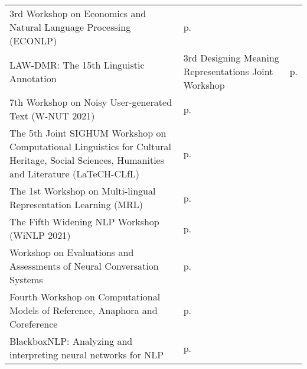 \begin{center}
\begin{tabular}{@{}%
  >{\raggedright\arraybackslash}p{}
  >{\raggedright\arraybackslash}p{}
  >{\raggedleft\arraybackslash}p{}}
  \multicolumn{2}{l}{\hspace{-1mm}\large Thursday} \\ \hline
3rd Workshop on Economics and Natural Language Processing (ECONLP) & p.\pageref{WShopO} \\
LAW-DMR: The 15th Linguistic Annotation & 3rd Designing Meaning Representations Joint Workshop & p.\pageref{WShopP} \\
7th Workshop on Noisy User-generated Text (W-NUT 2021) & p.\pageref{WShopQ} \\
The 5th Joint SIGHUM Workshop on Computational Linguistics for Cultural Heritage, Social Sciences, Humanities and Literature (LaTeCH-CLfL) & p.\pageref{WShopR} \\
The 1st Workshop on Multi-lingual Representation Learning (MRL) & p.\pageref{WShopS} \\
The Fifth Widening NLP Workshop (WiNLP 2021) & p.\pageref{WShopT} \\
Workshop on Evaluations and Assessments of Neural Conversation Systems & p.\pageref{WShopU} \\
Fourth Workshop on Computational Models of Reference, Anaphora and Coreference  & p.\pageref{WShopV} \\
BlackboxNLP: Analyzing and interpreting neural networks for NLP & p.\pageref{WShopW} \\

\end{tabular}
\end{center}
